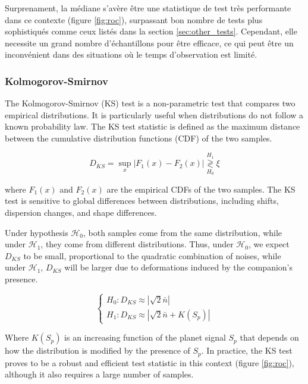 \documentclass{article}
\begin{document}
Surprenament, la médiane s'avère être une statistique de test très performante dans ce contexte (figure \ref{fig:roc}), surpassant bon nombre de tests plus sophistiqués comme ceux listés dans la section \ref{sec:other_tests}. Cependant, elle necessite un grand nombre d'échantillons pour être efficace, ce qui peut être un inconvénient dans des situations où le temps d'observation est limité.

\subsubsection{Kolmogorov-Smirnov}

The Kolmogorov-Smirnov (KS) test is a non-parametric test that compares two empirical distributions. It is particularly useful when distributions do not follow a known probability law. The KS test statistic is defined as the maximum distance between the cumulative distribution functions (CDF) of the two samples.

$$
D_{KS} = \sup_x |F_1(x) - F_2(x)| \stackrel{H_1}{\underset{H_0}{\gtrless}} \xi
$$

where $F_1(x)$ and $F_2(x)$ are the empirical CDFs of the two samples. The KS test is sensitive to global differences between distributions, including shifts, dispersion changes, and shape differences.

Under hypothesis $\mathcal{H}_0$, both samples come from the same distribution, while under $\mathcal{H}_1$, they come from different distributions. Thus, under $\mathcal{H}_0$, we expect $D_{KS}$ to be small, proportional to the quadratic combination of noises, while under $\mathcal{H}_1$, $D_{KS}$ will be larger due to deformations induced by the companion's presence.

$$
\begin{cases}
H_0 : D_{KS} \approx |\sqrt{2}\bar{n}|\\
H_1 : D_{KS} \approx |\sqrt{2}\bar{n} + K(S_p)|
\end{cases}
$$

Where $K(S_p)$ is an increasing function of the planet signal $S_p$ that depends on how the distribution is modified by the presence of $S_p$. In practice, the KS test proves to be a robust and efficient test statistic in this context (figure \ref{fig:roc}), although it also requires a large number of samples.



\end{document}
